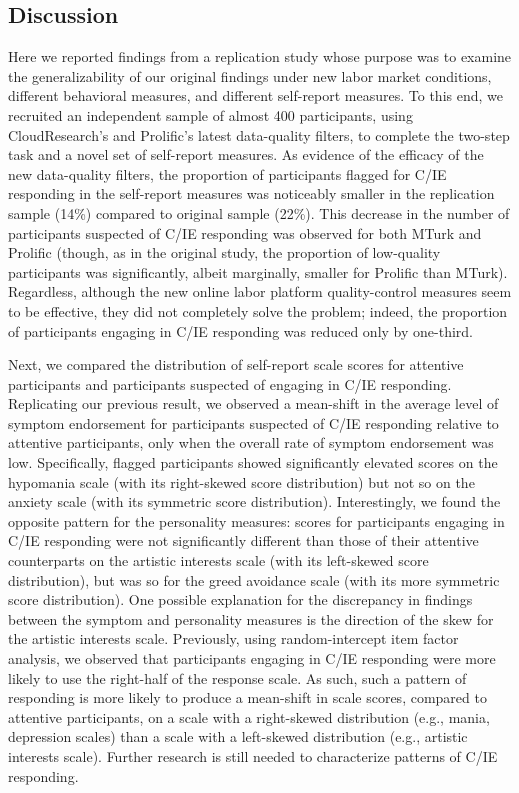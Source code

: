 \documentclass[a4paper,notitlepage,12pt]{article}
\begin{document}
\begin{refsection}[supp]
\subsection*{Discussion}

Here we reported findings from a replication study whose purpose was to examine the generalizability of our original findings under new labor market conditions, different behavioral measures, and different self-report measures. To this end, we recruited an independent sample of almost 400 participants, using CloudResearch's and Prolific's latest data-quality filters, to complete the two-step task and a novel set of self-report measures. As evidence of the efficacy of the new data-quality filters, the proportion of participants flagged for C/IE responding in the self-report measures was noticeably smaller in the replication sample (14\%) compared to original sample (22\%). This decrease in the number of participants suspected of C/IE responding was observed for both MTurk and Prolific (though, as in the original study, the proportion of low-quality participants was significantly, albeit marginally, smaller for Prolific than MTurk). Regardless, although the new online labor platform quality-control measures seem to be effective, they did not completely solve the problem; indeed, the proportion of participants engaging in C/IE responding was reduced only by one-third.

Next, we compared the distribution of self-report scale scores for attentive participants and participants suspected of engaging in C/IE responding. Replicating our previous result, we observed a mean-shift in the average level of symptom endorsement for participants suspected of C/IE responding relative to attentive participants, only when the overall rate of symptom endorsement was low. Specifically, flagged participants showed significantly elevated scores on the hypomania scale (with its right-skewed score distribution) but not so on the anxiety scale (with its symmetric score distribution). Interestingly, we found the opposite pattern for the personality measures: scores for participants engaging in C/IE responding were not significantly different than those of their attentive counterparts on the artistic interests scale (with its left-skewed score distribution), but was so for the greed avoidance scale (with its more symmetric score distribution). One possible explanation for the discrepancy in findings between the symptom and personality measures is the direction of the skew for the artistic interests scale. Previously, using random-intercept item factor analysis, we observed that participants engaging in C/IE responding were more likely to use the right-half of the response scale. As such, such a pattern of responding is more likely to produce a mean-shift in scale scores, compared to attentive participants, on a scale with a right-skewed distribution (e.g., mania, depression scales) than a scale with a left-skewed distribution (e.g., artistic interests scale). Further research is still needed to characterize patterns of C/IE responding. 


\end{refsection}
\end{document}
